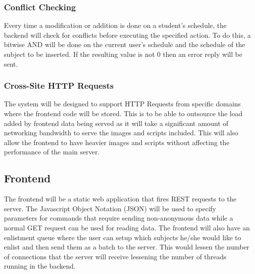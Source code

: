 \documentclass{sigchi}
\begin{document}
\subsubsection{Conflict Checking}

Every time a modification or addition is done on a student's schedule, the 
backend will check for conflicts before executing the specified action. 
To do this, a bitwise AND will be done on the current user's schedule and the
schedule of the subject to be inserted. If the resulting value is not 0 then
an error reply will be sent.

\subsubsection{Cross-Site HTTP Requests}

The system will be designed to support HTTP Requests from specific domains
where the frontend code will be stored. This is to be able to outsource the load
added by frontend data being served as it will take a significant amount of
networking bandwidth to serve the images and scripts included. This will also
allow the frontend to have heavier images and scripts without affecting the 
performance of the main server.


\subsection{Frontend}

The frontend will be a static web application that fires REST requests to the
server. The Javascript Object Notation (JSON) will be used to specify parameters
for commands that require sending non-anonymous data while a normal GET request
can be used for reading data. The frontend will also have an enlistment queue
where the user can setup which subjects he/she would like to enlist and then
send them as a batch to the server. This would lessen the number of connections
that the server will receive lessening the number of threads running in the 
backend.




% 
% 

\end{document}
